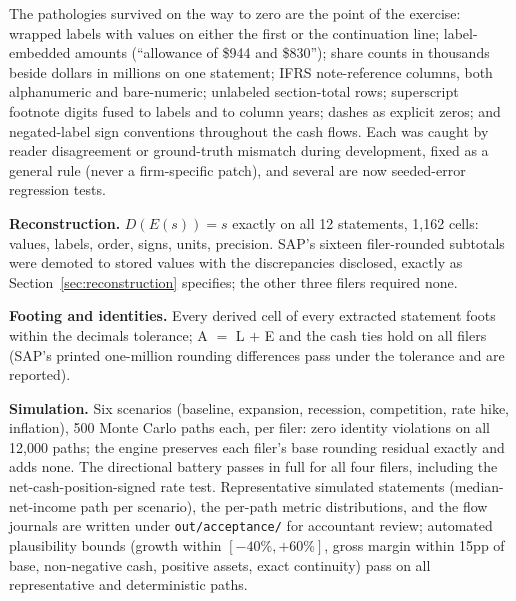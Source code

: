 \documentclass[11pt]{article}
\newcommand{\lead}[2]{\par\addvspace{5pt}\textbf{\textcolor{#1}{#2}}}
\begin{document}
The pathologies survived on the way to zero are the point of the exercise: wrapped labels with values on either the first or the continuation line; label-embedded amounts (``allowance of \$944 and \$830''); share counts in thousands beside dollars in millions on one statement; IFRS note-reference columns, both alphanumeric and bare-numeric; unlabeled section-total rows; superscript footnote digits fused to labels and to column years; dashes as explicit zeros; and negated-label sign conventions throughout the cash flows. Each was caught by reader disagreement or ground-truth mismatch during development, fixed as a general rule (never a firm-specific patch), and several are now seeded-error regression tests.

\lead{navytwo}{Reconstruction.} $D(E(s)) = s$ exactly on all 12 statements, 1{,}162 cells: values, labels, order, signs, units, precision. SAP's sixteen filer-rounded subtotals were demoted to stored values with the discrepancies disclosed, exactly as Section~\ref{sec:reconstruction} specifies; the other three filers required none.

\lead{navytwo}{Footing and identities.} Every derived cell of every extracted statement foots within the decimals tolerance; A $=$ L $+$ E and the cash ties hold on all filers (SAP's printed one-million rounding differences pass under the tolerance and are reported).

\lead{navytwo}{Simulation.} Six scenarios (baseline, expansion, recession, competition, rate hike, inflation), 500 Monte Carlo paths each, per filer: zero identity violations on all 12{,}000 paths; the engine preserves each filer's base rounding residual exactly and adds none. The directional battery passes in full for all four filers, including the net-cash-position-signed rate test. Representative simulated statements (median-net-income path per scenario), the per-path metric distributions, and the flow journals are written under \texttt{out/acceptance/} for accountant review; automated plausibility bounds (growth within $[-40\%, +60\%]$, gross margin within 15pp of base, non-negative cash, positive assets, exact continuity) pass on all representative and deterministic paths.
\end{document}
